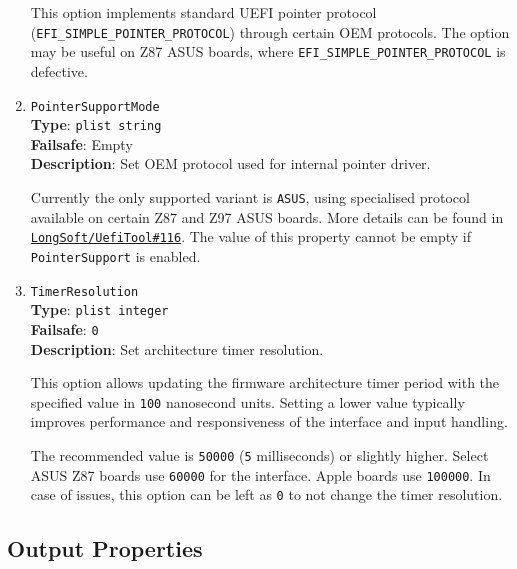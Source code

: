 \documentclass[]{article}
\makeatletter
\renewcommand{\label}[1]{%
\zref@wrapper@immediate{\oldlabel{#1}}}  %
\makeatother
\begin{document}
\begin{enumerate}
  This option implements standard UEFI pointer protocol (\texttt{EFI\_SIMPLE\_POINTER\_PROTOCOL})
  through certain OEM protocols. The option may be useful on Z87 ASUS boards, where
  \texttt{EFI\_SIMPLE\_POINTER\_PROTOCOL} is defective.

\item
  \texttt{PointerSupportMode}\\
  \textbf{Type}: \texttt{plist\ string}\\
  \textbf{Failsafe}: Empty\\
  \textbf{Description}: Set OEM protocol used for internal pointer driver.

  Currently the only supported variant is \texttt{ASUS}, using specialised protocol available
  on certain Z87 and Z97 ASUS boards. More details can be found in
  \href{https://github.com/LongSoft/UEFITool/pull/116}{\texttt{LongSoft/UefiTool\#116}}.
  The value of this property cannot be empty if \texttt{PointerSupport} is enabled.

\item
  \texttt{TimerResolution}\\
  \textbf{Type}: \texttt{plist\ integer}\\
  \textbf{Failsafe}: \texttt{0}\\
  \textbf{Description}: Set architecture timer resolution.

  This option allows updating the firmware architecture timer period with the specified value
  in \texttt{100} nanosecond units. Setting a lower value typically improves performance
  and responsiveness of the interface and input handling.

  The recommended value is \texttt{50000} (\texttt{5} milliseconds) or slightly higher. Select
  ASUS Z87 boards use \texttt{60000} for the interface. Apple boards use \texttt{100000}.
  In case of issues, this option can be left as \texttt{0} to not change the timer resolution.

\end{enumerate}

\subsection{Output Properties}\label{uefioutputprops}
\end{document}
